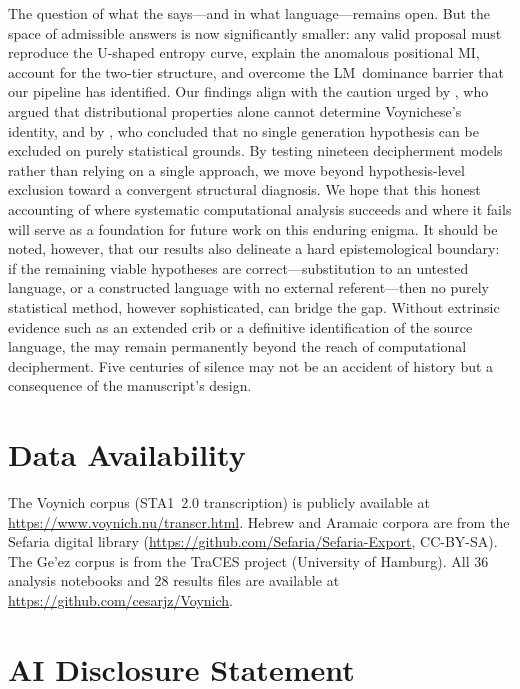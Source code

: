 The question of what the \vms{} says---and in what language---remains open.  But the space of admissible answers is now significantly smaller: any valid proposal must reproduce the U-shaped entropy curve, explain the anomalous positional MI, account for the two-tier structure, and overcome the LM~dominance barrier that our pipeline has identified.  Our findings align with the caution urged by \citet{bowern2021}, who argued that distributional properties alone cannot determine Voynichese's identity, and by \citet{timm2024}, who concluded that no single generation hypothesis can be excluded on purely statistical grounds.  By testing nineteen decipherment models rather than relying on a single approach, we move beyond hypothesis-level exclusion toward a convergent structural diagnosis.  We hope that this honest accounting of where systematic computational analysis succeeds and where it fails will serve as a foundation for future work on this enduring enigma.  It should be noted, however, that our results also delineate a hard epistemological boundary: if the remaining viable hypotheses are correct---substitution to an untested language, or a constructed language with no external referent---then no purely statistical method, however sophisticated, can bridge the gap.  Without extrinsic evidence such as an extended crib or a definitive identification of the source language, the \vms{} may remain permanently beyond the reach of computational decipherment.  Five centuries of silence may not be an accident of history but a consequence of the manuscript's design.



\section*{Data Availability}

The Voynich corpus (STA1~2.0 transcription) is publicly available at \url{https://www.voynich.nu/transcr.html}.  Hebrew and Aramaic corpora are from the Sefaria digital library (\url{https://github.com/Sefaria/Sefaria-Export}, CC-BY-SA).  The Ge'ez corpus is from the TraCES project (University of Hamburg).  All 36 analysis notebooks and 28 results files are available at \url{https://github.com/cesarjz/Voynich}.

\section*{AI Disclosure Statement}

